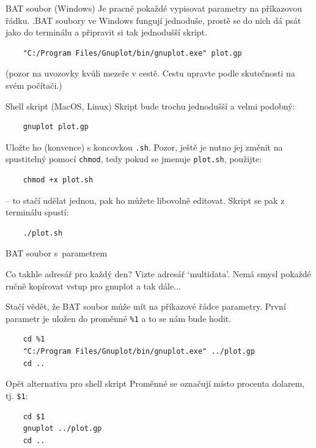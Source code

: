 \documentclass{beamer}
\begin{document}
\begin{frame}[fragile]{BAT soubor (Windows)}
  Je pracné pokaždé vypisovat parametry na příkazovou řádku. .BAT soubory ve Windows fungují jednoduše, prostě se do nich dá psát jako do terminálu a připravit si tak jednodušší skript.
  {\scriptsize
  \begin{verbatim}
    "C:/Program Files/Gnuplot/bin/gnuplot.exe" plot.gp
  \end{verbatim}
  }
  (pozor na uvozovky kvůli mezeře v cestě. Cestu upravte podle skutečnosti na svém počítači.)
\end{frame}

\begin{frame}[fragile]{Shell skript (MacOS, Linux)}
  Skript bude trochu jednodušší a velmi podobný:
  \begin{verbatim}
    gnuplot plot.gp
  \end{verbatim}
  Uložte ho (konvence) s koncovkou \texttt{.sh}. Pozor, ještě je nutno jej změnit na spustitelný pomocí \texttt{chmod}, tedy pokud se jmenuje \texttt{plot.sh}, použijte:
  \begin{verbatim}
    chmod +x plot.sh
  \end{verbatim}
  -- to stačí udělat jednou, pak ho můžete libovolně editovat. Skript se pak z terminálu spustí:
  \begin{verbatim}
    ./plot.sh
  \end{verbatim}
\end{frame}

\begin{frame}[fragile]{BAT soubor s~parametrem}
  
  Co takhle adresář pro každý den? Vizte adresář `multidata'. Nemá smysl pokaždé ručně kopírovat vstup pro gnuplot a tak dále... 

  Stačí vědět, že BAT soubor může mít na příkazové řádce parametry. První parametr je uložen do proměnné \texttt{\%1} a to se nám bude hodit.

{\scriptsize
  \begin{verbatim}
    cd %1
    "C:/Program Files/Gnuplot/bin/gnuplot.exe" ../plot.gp
    cd ..
  \end{verbatim}
  }
\end{frame}

\begin{frame}[fragile]{Opět alternativa pro shell skript}
  Proměnné se označují místo procenta dolarem, tj. \texttt{\$1}:

  \begin{verbatim}
    cd $1
    gnuplot ../plot.gp
    cd ..
  \end{verbatim}
\end{frame}
\end{document}
